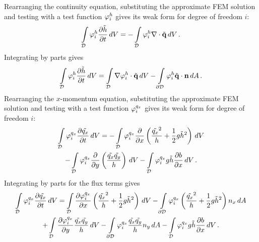 Rearranging the continuity equation, substituting the approximate FEM
solution and testing with a test function $\varphi_i^h$ gives its
weak form for degree of freedom $i$:
\begin{equation}
  \int\limits_{\mathcal{D}} \varphi_i^h\frac{\partial \tilde{h}}{\partial t} \,dV
  = - \int\limits_{\mathcal{D}} \varphi_i^h\nabla\cdot\tilde{\mathbf{q}} \,dV
  \,.
\end{equation}
Integrating by parts gives
\begin{equation}\label{eq:shallowwater_height_weak_form}
  \int\limits_{\mathcal{D}} \varphi_i^h\frac{\partial \tilde{h}}{\partial t} \,dV
  = \int\limits_{\mathcal{D}} \nabla\varphi_i^h\cdot\tilde{\mathbf{q}} \,dV
  - \int\limits_{\partial\mathcal{D}} \varphi_i^h\tilde{\mathbf{q}}\cdot\mathbf{n} \,dA
  \,.
\end{equation}
Rearranging the $x$-momentum equation, substituting the approximate FEM solution
and testing with a test function $\varphi_i^{q_x}$
gives its weak form for degree of freedom $i$:
\begin{multline}
  \int\limits_{\mathcal{D}} \varphi_i^{q_x}\frac{\partial \tilde{q_x}}{\partial t} \,dV
  =
  - \int\limits_{\mathcal{D}} \varphi_i^{q_x}
      \frac{\partial }{\partial x}\left(\frac{\tilde{q_x}^2}{h}
      + \frac{1}{2}g\tilde{h}^2\right) \,dV
  \\
  - \int\limits_{\mathcal{D}} \varphi_i^{q_x}
      \frac{\partial }{\partial y}\left(\frac{\tilde{q_x}\tilde{q_y}}
        {h}\right) \,dV
  - \int\limits_{\mathcal{D}} \varphi_i^{q_x}
      g\tilde{h}\frac{\partial b}{\partial x} \,dV
  \,.
\end{multline}
Integrating by parts for the flux terms gives
\begin{multline}\label{eq:shallowwater_momentumx_weak_form}
  \int\limits_{\mathcal{D}} \varphi_i^{q_x}\frac{\partial \tilde{q_x}}{\partial t} \,dV
  =
    \int\limits_{\mathcal{D}} \frac{\partial \varphi_i^{q_x}}{\partial x}
      \left(\frac{\tilde{q_x}^2}{h}
      + \frac{1}{2}g\tilde{h}^2\right) \,dV
  - \int\limits_{\partial\mathcal{D}} \varphi_i^{q_x}
      \left(\frac{\tilde{q_x}^2}{h}
      + \frac{1}{2}g\tilde{h}^2\right)n_x \,dA
  \\
  + \int\limits_{\mathcal{D}} \frac{\partial \varphi_i^{q_x}}{\partial y}
      \frac{\tilde{q_x}\tilde{q_y}}
        {h} \,dV
  - \int\limits_{\partial\mathcal{D}} \varphi_i^{q_x}
      \frac{\tilde{q_x}\tilde{q_y}}
        {h}n_y \,dA
  - \int\limits_{\mathcal{D}} \varphi_i^{q_x}
      g\tilde{h}\frac{\partial b}{\partial x} \,dV
  \,.
\end{multline}
